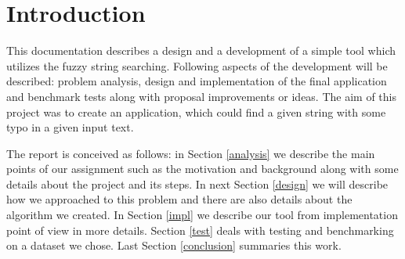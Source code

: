 \documentclass[12pt,a4paper,titlepage,final]{article}
\begin{document}

\def\myauthor{Ladislav Šulák}
\def\myauthorA{Krisztián Benko}
\def\myemail{xsulak04@stud.fit.vutbr.cz}
\def\myemailA{kristianbnk@gmail.com}
\def\projname{Fuzzy string searching}



\pagestyle{plain}
\setcounter{page}{1}
\tableofcontents

\newpage
\pagestyle{plain}
\setcounter{page}{1}

\section{Introduction} \label{intro}
This documentation describes a design and a development of a simple tool which utilizes the fuzzy string searching. Following aspects of the development will be described: problem analysis, design and implementation of the final application and benchmark tests along with proposal improvements or ideas. The aim of this project was to create an application, which could find a given string with some typo in a given input text.

The report is conceived as follows: in Section \ref{analysis} we describe the main points of our assignment such as the motivation and background along with some details about the project and its steps. In next Section \ref{design} we will  describe how we approached to this problem and there are also details about the algorithm we created. In Section \ref{impl} we describe our tool from implementation point of view in more details. Section \ref{test} deals with testing and benchmarking on a dataset we chose. Last Section \ref{conclusion} summaries this work.

\newpage

\end{document}
